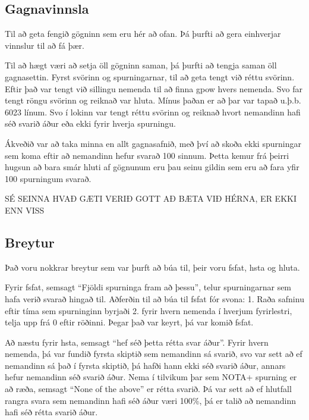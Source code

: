 \documentclass[
  12pt,
]{article}
\begin{document}
\hypertarget{gagnavinnsla}{%
\subsection{Gagnavinnsla}\label{gagnavinnsla}}

Til að geta fengið gögninn sem eru hér að ofan. Þá þurfti að gera einhverjar vinnslur til að fá þær.

Til að hægt væri að setja öll gögninn saman, þá þurfti að tengja saman öll gagnasettin. Fyrst svörinn og spurningarnar, til að geta tengt við réttu svörinn. Eftir það var tengt við sillingu nemenda til að finna gpow hvers nemenda. Svo far tengt röngu svörinn og reiknað var hluta. Mínus þaðan er að þar var tapað u.þ.b. 6023 línum. Svo í lokinn var tengt réttu svörinn og reiknað hvort nemandinn hafi séð svarið áður eða ekki fyrir hverja spurningu.

Ákveðið var að taka minna en allt gagnasafnið, með því að skoða ekki spurningar sem koma eftir að nemandinn hefur svarað 100 sinnum. Þetta kemur frá þeirri hugsun að bara smár hluti af gögnunum eru þau seinu gildin sem eru að fara yfir 100 spurningum svarað.

SÉ SEINNA HVAÐ GÆTI VERIÐ GOTT AÐ BÆTA VIÐ HÉRNA, ER EKKI ENN VISS

\hypertarget{breytur}{%
\subsection{Breytur}\label{breytur}}

Það voru nokkrar breytur sem var þurft að búa til, þeir voru fsfat, hsta og hluta.

Fyrir fsfat, semsagt ``Fjöldi spurninga fram að þessu'', telur spurningarnar sem hafa verið svarað hingað til. Aðferðin til að búa til fsfat fór svona:
1. Raða safninu eftir tíma sem spurninginn byrjaði
2. fyrir hvern nemenda í hverjum fyrirlestri, telja upp frá 0 eftir röðinni.
Þegar það var keyrt, þá var komið fsfat.

Að næstu fyrir hsta, semsagt ``hef séð þetta rétta svar áður''. Fyrir hvern nemenda, þá var fundið fyrsta skiptið sem nemandinn sá svarið, svo var sett að ef nemandinn sá það í fyrsta skiptið, þá hafði hann ekki séð svarið áður, annars hefur nemandinn séð svarið áður. Nema í tilvikum þar sem NOTA+ spurning er að ræða, semsagt ``None of the above'' er rétta svarið. Þá var sett að ef hlutfall rangra svara sem nemandinn hafi séð áður væri 100\%, þá er talið að nemandinn hafi séð rétta svarið áður.
\end{document}
